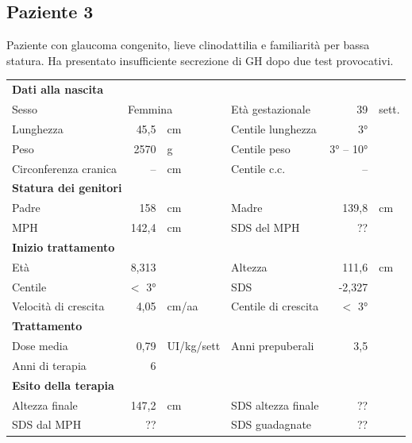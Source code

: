 \clearpage

\subsection*{Paziente 3}%

Paziente con glaucoma congenito, lieve clinodattilia e familiarità per bassa statura. Ha presentato insufficiente secrezione di GH  dopo due test provocativi.


\begin{table}[!h]
\begin{tabular}{lrllrl}
\toprule
\multicolumn{6}{l}{\textbf{Dati alla nascita}}\\
Sesso 		& \multicolumn{2}{l}{Femmina} 	& Età gestazionale 		& 39 		& sett.\\
Lunghezza 	& 45,5 		& cm 				& Centile lunghezza		& 3° 		\\
Peso 		& 2570 		& g					& Centile peso			& 3° -- 10° 		\\
Circonferenza cranica	& -- 		& cm 	& Centile c.c.			& -- \\
\midrule
\multicolumn{6}{l}{\textbf{Statura dei genitori}}\\
Padre 		& 158 & cm 		& Madre 				& 139,8 & cm \\
MPH 		& 142,4 & cm 	& SDS del MPH 			& ?? \\
\midrule
\multicolumn{6}{l}{\textbf{Inizio trattamento}} \\
Età	& 8,313 & 		& Altezza 				& 111,6 & cm  \\
Centile & $<$ 3° 	 &		& SDS		& -2,327 \\
Velocità di crescita & 4,05 & cm/aa	& Centile di crescita & $<$ 3°\\
\midrule
\multicolumn{6}{l}{\textbf{Trattamento}} \\
Dose media		& 0,79 & UI/kg/sett & Anni prepuberali & 3,5\\
Anni di terapia & 6\\
\midrule
\multicolumn{6}{l}{\textbf{Esito della terapia}} \\
Altezza finale	& 147,2 & cm 	& SDS altezza finale 	& ??\\
SDS dal MPH	& ?? 	&		& SDS guadagnate 			& ??\\
\bottomrule
\end{tabular}
\end{table}
\clearpage

